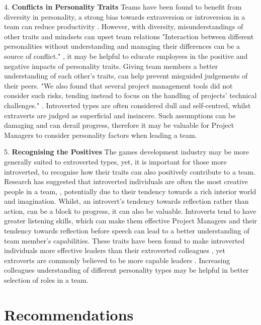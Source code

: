 \documentclass{scrartcl}
\begin{document}
4.	\textbf{Conflicts in Personality Traits} \newline
Teams have been found to benefit from diversity in personality, a strong bias towards extraversion or introversion in a team can reduce productivity \cite{Hoffman}. However, with diversity, misunderstandings of other traits and mindsets can upset team relations "Interaction between different personalities without understanding and managing their differences can be a source of conflict." \cite{LicorishPhilpottMacDonel}, it may be helpful to educate employees in the positive and negative impacts of personality traits. Giving team members a better understanding of each other's traits, can help prevent misguided judgements of their peers. "We also found that several project management tools did not consider such risks, tending instead to focus on the handling of projects' technical challenges." \cite{LicorishPhilpottMacDonel}. Introverted types are often considered dull and self-centred, whilst extraverts are judged as superficial and insincere. Such assumptions can be damaging and can derail progress, therefore it may be valuable for Project Managers to consider personality factors when leading a team.


5.	\textbf{Recognising the Positives} \newline
The games development industry may be more generally suited to extroverted types, yet, it is important for those more introverted, to recognise how their traits can also positively contribute to a team. Research has suggested that introverted individuals are often the most creative people in a team, \cite{feist}, potentially due to their tendency towards a rich interior world and imagination. Whilst, an introvert's tendency towards reflection rather than action, can be a block to progress, it can also be valuable. Introverts tend to have greater listening skills, which can make them effective Project Managers and their tendency towards reflection before speech can lead to a better understanding of team member's capabilities. These traits have been found to make introverted individuals more effective leaders than their extroverted colleagues \cite{Morrish}, yet extroverts are commonly believed to be more capable leaders \cite{Cain}. Increasing colleagues understanding of different personality types may be helpful in better selection of roles in a team.

\section{Recommendations}
\end{document}
